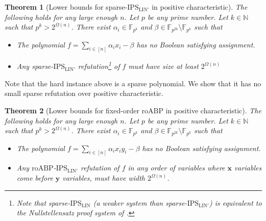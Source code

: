 \documentclass[11pt]{article}
\newtheorem{theorem}{Theorem}[section]
\newcommand{\F}{\mathbb{F}}
\renewcommand{\comment}[2]{\marginpar{\tiny{\textbf{#1: }\textit{#2}}}}
\newcommand{\vr}[1]{\comment{VR}{#1}}
\newcommand{\ssr}[1]{\comment{SS}{#1}}
\newcommand{\IPSLIN}{\mathrm{IPS}_{\mathrm{LIN}}}
\newcommand{\IPSLINp}{\mathrm{IPS}_{\mathrm{LIN}'}}
\newcommand{\roABP}{\mathrm{roABP}}
\begin{document}
\begin{theorem}[Lower bounds for sparse-$\IPSLINp$ in positive characteristic]
    \label{thm:lbd-sparse}
    The following holds for any large enough $n$. Let $p$ be any prime number. Let $k \in \mathbb{N}$ such that $p^k > 2^{\Omega(n)}$. There exist $\alpha_{i}\in \F_{p^{k}}$ and $\beta \in \F_{p^{{{2k}}}}\setminus \F_{p^{k}}$ %
    such that 
    \begin{itemize}
        \item The polynomial $f = \sum_{i \in [n]}\alpha_{i} x_i - \beta$ has no Boolean satisfying assignment.
        \item Any sparse-$\IPSLINp$ refutation\footnote{Note that sparse-$\IPSLIN$ (a weaker system than sparse-$\IPSLINp$) is equivalent to the Nullstellensatz proof system of \cite{BIKPP94}.} of $f$ must have size at least $2^{\Omega(n)}$ 
    \end{itemize}
\end{theorem}
Note that the hard instance above is a sparse polynomial. We show that it has no small sparse refutation over positive characteristic. 

\begin{theorem}[Lower bounds for fixed-order $\roABP$ in positive characteristic]
    \label{thm:lbd-fixed-order-roabp}
    The following holds for any large enough $n$. Let $p$ be any prime number. Let $k \in \mathbb{N}$ such that $p^k > 2^{\Omega(n)}$.  There exist $\alpha_{i}\in \F_{p^k}$ and $\beta \in \F_{p^{2k}}\setminus \F_{p^k}$ such that 
    \begin{itemize}
        \item The polynomial $f = \sum_{i \in [n]}\alpha_{i} x_i y_i - \beta$ has no Boolean satisfying assignment.
        \item Any $\roABP$-$\IPSLINp$ refutation of $f$ in any order of variables where $\mathbf{x}$ variables come before $\mathbf{y}$ variables, must have width $2^{\Omega(n)}$. 
    \end{itemize}
\end{theorem}
\end{document}
